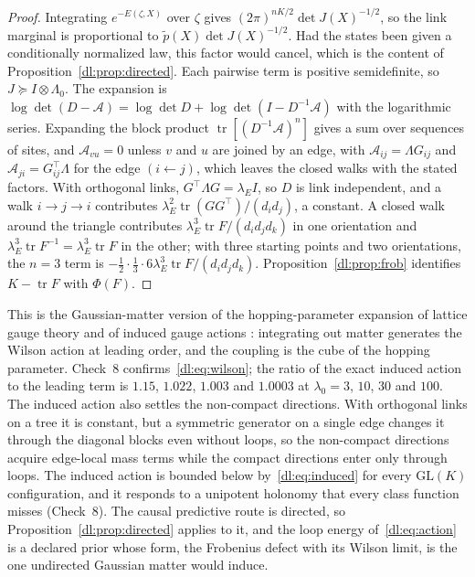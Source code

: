\documentclass[11pt]{article}
\theoremstyle{definition}
\theoremstyle{remark}
\providecommand{\GL}{\mathrm{GL}}
\providecommand{\tr}{\operatorname{tr}}
\begin{document}
\begin{proof}
Integrating $e^{-E(\zeta,X)}$ over $\zeta$ gives $(2\pi)^{nK/2}\det J(X)^{-1/2}$, so the link marginal is proportional to $\tilde p(X)\det J(X)^{-1/2}$. Had the states been given a conditionally normalized law, this factor would cancel, which is the content of Proposition~\ref{dl:prop:directed}. Each pairwise term is positive semidefinite, so $J\succeq I\otimes\Lambda_0$. The expansion is $\log\det(D-\mathcal A)=\log\det D+\log\det(I-D^{-1}\mathcal A)$ with the logarithmic series. Expanding the block product $\tr[(D^{-1}\mathcal A)^n]$ gives a sum over sequences of sites, and $\mathcal A_{vu}=0$ unless $v$ and $u$ are joined by an edge, with $\mathcal A_{ij}=\Lambda G_{ij}$ and $\mathcal A_{ji}=G_{ij}^\top\Lambda$ for the edge $(i\leftarrow j)$, which leaves the closed walks with the stated factors. With orthogonal links, $G^\top\Lambda G=\lambda_EI$, so $D$ is link independent, and a walk $i\to j\to i$ contributes $\lambda_E^2\tr(GG^\top)/(d_id_j)$, a constant. A closed walk around the triangle contributes $\lambda_E^3\tr F/(d_id_jd_k)$ in one orientation and $\lambda_E^3\tr F^{-1}=\lambda_E^3\tr F$ in the other; with three starting points and two orientations, the $n=3$ term is $-\tfrac12\cdot\tfrac13\cdot6\lambda_E^3\tr F/(d_id_jd_k)$. Proposition~\ref{dl:prop:frob} identifies $K-\tr F$ with $\Phi(F)$.
\end{proof}

This is the Gaussian-matter version of the hopping-parameter expansion of lattice gauge theory \cite{dl:montvay1994} and of induced gauge actions \cite{dl:kazakov1993}: integrating out matter generates the Wilson action at leading order, and the coupling is the cube of the hopping parameter. Check~8 confirms~\eqref{dl:eq:wilson}; the ratio of the exact induced action to the leading term is $1.15$, $1.022$, $1.003$ and $1.0003$ at $\lambda_0=3$, $10$, $30$ and $100$. The induced action also settles the non-compact directions. With orthogonal links on a tree it is constant, but a symmetric generator on a single edge changes it through the diagonal blocks even without loops, so the non-compact directions acquire edge-local mass terms while the compact directions enter only through loops. The induced action is bounded below by~\eqref{dl:eq:induced} for every $\GL(K)$ configuration, and it responds to a unipotent holonomy that every class function misses (Check~8). The causal predictive route is directed, so Proposition~\ref{dl:prop:directed} applies to it, and the loop energy of~\eqref{dl:eq:action} is a declared prior whose form, the Frobenius defect with its Wilson limit, is the one undirected Gaussian matter would induce.
\end{document}
